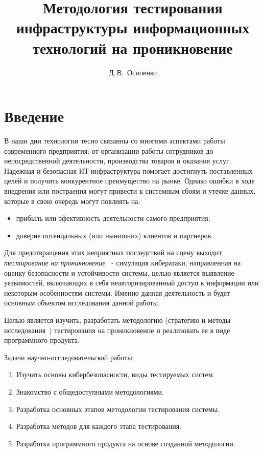 \documentclass[14pt, oneside]{altsu-report}
\title{Методология тестирования инфраструктуры информационных технологий на проникновение}
\author{Д.\,В.~Осипенко}
\institute{Институт цифровых технологий, электроники и физики}
\date{\the\year}
\begin{document}
\maketitle

\setcounter{page}{1}
\makeabstract
\tableofcontents

\chapter*{Введение}
В наши дни технологии тесно связанны со многими аспектами работы современного предприятия: от организации работы сотрудников до непосредственной деятельности, производства товаров и оказания услуг. 
Надежная и безопасная ИТ-инфраструктура помогает достигнуть поставленных целей и получить конкурентное преимущество на рынке.
Однако ошибки в ходе внедрения или постраения могут привести к системным сбоям и утечке данных, которые в свою очередь могут повлиять на:
\begin{itemize}
    \item прибыль или эфективность деятельности самого предприятия;
    \item доверие потенцальных (или нынишних) клиентов и партнеров.
\end{itemize}

Для предотвращения этих неприятных последствий на сцену выходит \textit{тестирование на проникновение}~\cite{wikiPentest} - симулация кибератаки, направленная на оценку безопасности и устойчивости системы, целью является выявление уязвимостей, включающих в себя неавторизированный доступ к информации или некоторым особенностям системы. 
Именно данная деятельность и будет основным объектом исследования данной работы. 

Целью является изучить, разработать методологию (стратегию и методы исследования~\cite{wikiMethodology}) тестирования на проникновение и реализовать ее в виде программного продукта.

Задачи научно-исследовательской работы:
\begin{enumerate}
    \item Изучить основы кибербезопасности, виды тестируемых систем.
    \item Знакомство с общедоступными методологиями.
    \item Разработка основных этапов методологии тестирования системы.
    \item Разработка методов для каждого этапа тестирования.
    \item Разработка программного продукта на основе созданной методологии.
\end{enumerate}
\end{document}
